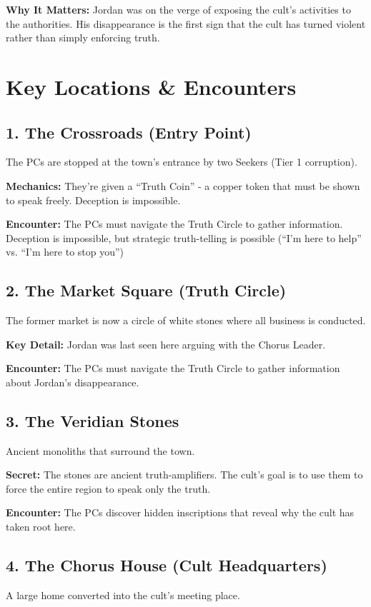 \documentclass[11pt]{article}
\newcommand{\keypoint}[1]{\par\noindent\textbf{\textcolor{accentorange}{#1}}}
\begin{document}
\keypoint{Why It Matters:} Jordan was on the verge of exposing the cult's activities to the authorities. His disappearance is the first sign that the cult has turned violent rather than simply enforcing truth.

\section{Key Locations \& Encounters}

\subsection{1. The Crossroads (Entry Point)}
The PCs are stopped at the town's entrance by two Seekers (Tier 1 corruption).

\keypoint{Mechanics:} They're given a ``Truth Coin'' - a copper token that must be shown to speak freely. Deception is impossible.

\keypoint{Encounter:} The PCs must navigate the Truth Circle to gather information. Deception is impossible, but strategic truth-telling is possible (``I'm here to help'' vs. ``I'm here to stop you'')

\subsection{2. The Market Square (Truth Circle)}
The former market is now a circle of white stones where all business is conducted.

\keypoint{Key Detail:} Jordan was last seen here arguing with the Chorus Leader.

\keypoint{Encounter:} The PCs must navigate the Truth Circle to gather information about Jordan's disappearance.

\subsection{3. The Veridian Stones}
Ancient monoliths that surround the town.

\keypoint{Secret:} The stones are ancient truth-amplifiers. The cult's goal is to use them to force the entire region to speak only the truth.

\keypoint{Encounter:} The PCs discover hidden inscriptions that reveal why the cult has taken root here.

\subsection{4. The Chorus House (Cult Headquarters)}
A large home converted into the cult's meeting place.
\end{document}
